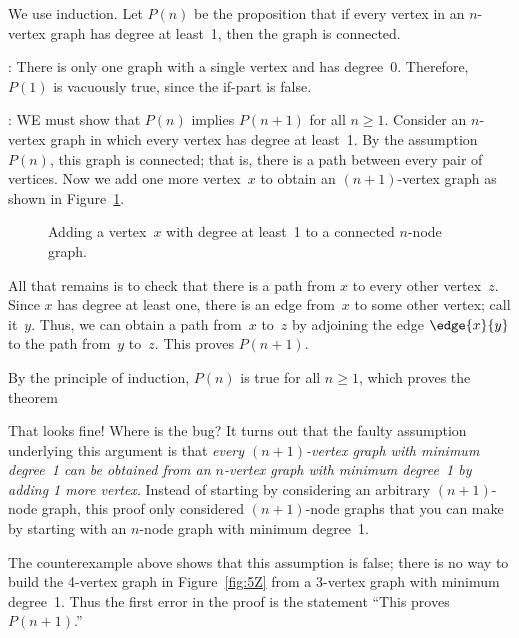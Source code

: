 \begin{falseproof}
We use induction.  Let $P(n)$ be the proposition that if every vertex
in an $n$-vertex graph has degree at least~1, then the graph is
connected.

: There is only one graph with a single
vertex and has degree~0.  Therefore, $P(1)$ is vacuously true, since
the if-part is false.

: WE must show that $P(n)$ implies
$P(n+1)$ for all $n \ge 1$.  Consider an $n$-vertex graph in which
every vertex has degree at least~1.  By the assumption~$P(n)$, this
graph is connected; that is, there is a path between every pair of
vertices.  Now we add one more vertex~$x$ to obtain an $(n+1)$-vertex
graph as shown in Figure~\ref{fig:5Y}.

\begin{figure}[h]

\missinggraphic

\caption{Adding a vertex~$x$ with degree at least~1 to a connected
  $n$-node graph.}

\label{fig:5Y}

\end{figure}

All that remains is to check that there is a path from $x$ to every
other vertex~$z$.  Since $x$ has degree at least one, there is an edge
from~$x$ to some other vertex; call it~$y$.  Thus, we can obtain a
path from~$x$ to~$z$ by adjoining the edge $\edge{x}{y}$ to the path
from~$y$ to~$z$.  This proves $P(n + 1)$.

By the principle of induction, $P(n)$ is true for all  $n \ge 1$,
which proves the theorem
\end{falseproof}

That looks fine!  Where is the bug?  It turns out that the faulty
assumption underlying this argument is that \emph{every $(n +
  1)$-vertex graph with minimum degree~1 can be obtained from an
  $n$-vertex graph with minimum degree~1 by adding 1 more vertex}.
Instead of starting by considering an arbitrary $(n + 1)$-node graph,
this proof only considered $(n + 1)$-node graphs that you can make by
starting with an $n$-node graph with minimum degree~1.

The counterexample above shows that this assumption is false; there is
no way to build the 4-vertex graph in Figure~\ref{fig:5Z} from a
3-vertex graph with minimum degree~1.  Thus the first error in the
proof is the statement ``This proves $P(n + 1)$.''

